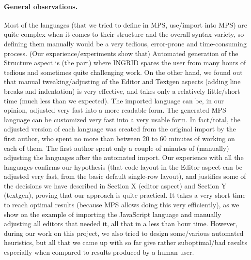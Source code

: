 \paragraph{General observations.}
Most of the languages (that we tried to define in MPS, use/import into MPS) are quite complex when it comes to their structure and the overall syntax variety, so defining them manually would be a very tedious, error-prone and time-consuming process.
(Our experience/experiments show that) Automated generation of the Structure aspect is (the part) where INGRID spares the user from many hours of tedious and sometimes quite challenging work.
On the other hand, we found out that manual tweaking/adjusting of the Editor and Textgen aspects (adding line breaks and indentation) is very effective, and takes only a relatively little/short time (much less than we expected).
The imported language can be, in our opinion, adjusted very fast into a more readable form.
The generated MPS language can be customized very fast into a very usable form.
In fact/total, the adjusted version of each language was created from the original import by the first author, who spent no more than between 20 to 60 minutes of working on each of them.
The first author spent only a couple of minutes of (manually) adjusting the languages after the automated import.
Our experience with all the languages confirms our hypothesis (that code layout in the Editor aspect can be adjusted very fast, from the basic default single-row layout), and justifies some of the decisions we have described in Section X (editor aspect) and Section Y (textgen), proving that our approach is quite practical.
It takes a very short time to reach optimal results (because MPS allows doing this very efficiently), as we show on the example of importing the JavaScript language and manually adjusting all editors that needed it, all that in a less than hour time.
 However, during our work on this project, we also tried to design some/various automated heuristics, but all that we came up with so far give rather suboptimal/bad results especially when compared to results produced by a human user.


